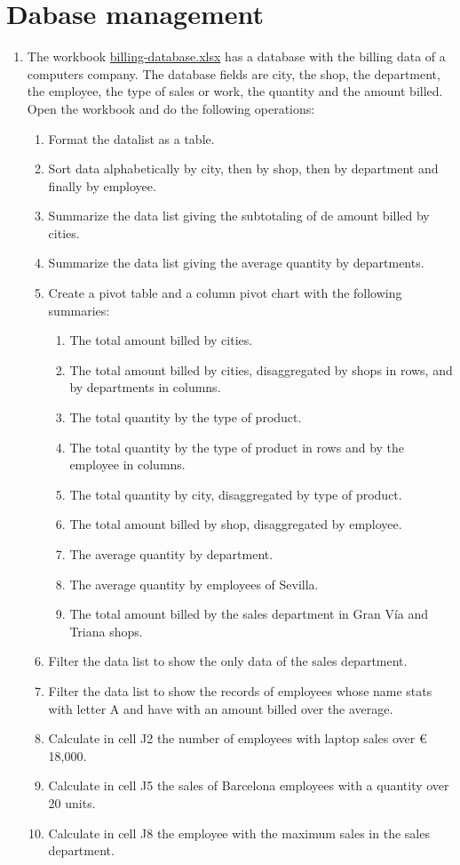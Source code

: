 
\section{Dabase management}
\begin{enumerate}[leftmargin=*]
\item The workbook
\href{http://aprendeconalf.es/office/excel/exercises/formulas/billing-database.xlsx}{\textsf{billing-database.xlsx}}
has a database with the billing data of a computers company.
The database fields are city, the shop, the department, the employee, the type of sales or work, the quantity and the
amount billed. 
Open the workbook and do the following operations:
\begin{enumerate}
\item Format the datalist as a table.
\item Sort data alphabetically by city, then by shop, then by department and finally by employee.
\item Summarize the data list giving the subtotaling of de amount billed by cities. 
\item Summarize the data list giving the average quantity by departments. 
\item Create a pivot table and a column pivot chart with the following summaries: 
\begin{enumerate}
\item The total amount billed by cities.  
\item The total amount billed by cities, disaggregated by shops in rows, and by departments in columns.  
\item The total quantity by the type of product. 
\item The total quantity by the type of product in rows and by the employee in columns.  
\item The total quantity by city, disaggregated by type of product. 
\item The total amount billed by shop, disaggregated by employee.
\item The average quantity by department. 
\item The average quantity by employees of Sevilla. 
\item The total amount billed by the sales department in Gran Vía and Triana shops.    
\end{enumerate}
\item Filter the data list to show the only data of the sales department.
\item Filter the data list to show the records of employees whose name stats with letter A and have with an amount
billed over the average.
\item Calculate in cell J2 the number of employees with laptop sales over € 18,000.  
\item Calculate in cell J5 the sales of Barcelona employees with a quantity over 20 units. 
\item Calculate in cell J8 the employee with the maximum sales in the sales department.

\end{enumerate}


\end{enumerate}